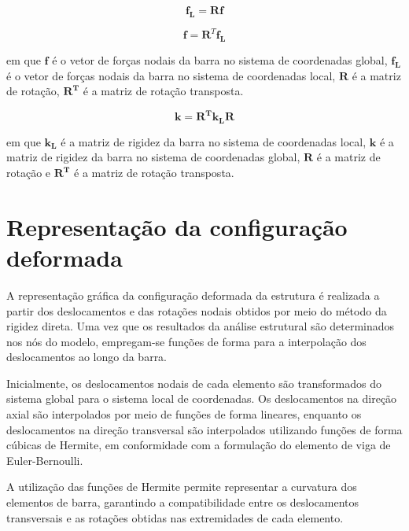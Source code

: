 \begin{equation}
\mathbf{f_{L}} = \mathbf{R} \mathbf{f}
\label{eq:transformação_G_L}
\end{equation}

\begin{equation}
\mathbf{f} = \mathbf{R}^T \mathbf{f_{L}}
\label{eq:transformação_L_G}
\end{equation}

em que $\mathbf{f}$ é o vetor de forças nodais da barra no sistema de coordenadas global, $\mathbf{f_{L}}$ é o vetor de forças nodais da barra no sistema de coordenadas local, $\mathbf{{R}}$ é a matriz de rotação, $\mathbf{{R}^T}$ é a matriz de rotação transposta.

\begin{equation}
\mathbf{k} = \mathbf{{R}^T}\mathbf{k_{L}}\mathbf{{R}}  
\label{eq:kG}
\end{equation}

em que $\mathbf{k_{L}}$ é a matriz de rigidez da barra no sistema de coordenadas local, $\mathbf{k}$ é a matriz de rigidez da barra no sistema de coordenadas global, $\mathbf{{R}}$ é a matriz de rotação e $\mathbf{{R}^T}$ é a matriz de rotação transposta.

\section{Representação da configuração deformada}

A representação gráfica da configuração deformada da estrutura é realizada a partir dos deslocamentos e das rotações nodais obtidos por meio do método da rigidez direta. Uma vez que os resultados da análise estrutural são determinados nos nós do modelo, empregam-se funções de forma para a interpolação dos deslocamentos ao longo da barra.

Inicialmente, os deslocamentos nodais de cada elemento são transformados do sistema global para o sistema local de coordenadas. Os deslocamentos na direção axial são interpolados por meio de funções de forma lineares, enquanto os deslocamentos na direção transversal são interpolados utilizando funções de forma cúbicas de Hermite, em conformidade com a formulação do elemento de viga de Euler-Bernoulli.

A utilização das funções de Hermite permite representar a curvatura dos elementos de barra, garantindo a compatibilidade entre os deslocamentos transversais e as rotações obtidas nas extremidades de cada elemento.

